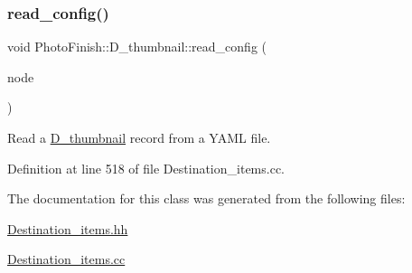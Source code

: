 \subsubsection{\texorpdfstring{read\+\_\+config()}{read\_config()}}
{\footnotesize\ttfamily void Photo\+Finish\+::\+D\+\_\+thumbnail\+::read\+\_\+config (\begin{DoxyParamCaption}\item[{const Y\+A\+M\+L\+::\+Node \&}]{node }\end{DoxyParamCaption})}



Read a \hyperlink{class_photo_finish_1_1_d__thumbnail}{D\+\_\+thumbnail} record from a Y\+A\+ML file. 



Definition at line 518 of file Destination\+\_\+items.\+cc.



The documentation for this class was generated from the following files\+:\begin{DoxyCompactItemize}
\item 
\hyperlink{_destination__items_8hh}{Destination\+\_\+items.\+hh}\item 
\hyperlink{_destination__items_8cc}{Destination\+\_\+items.\+cc}\end{DoxyCompactItemize}
